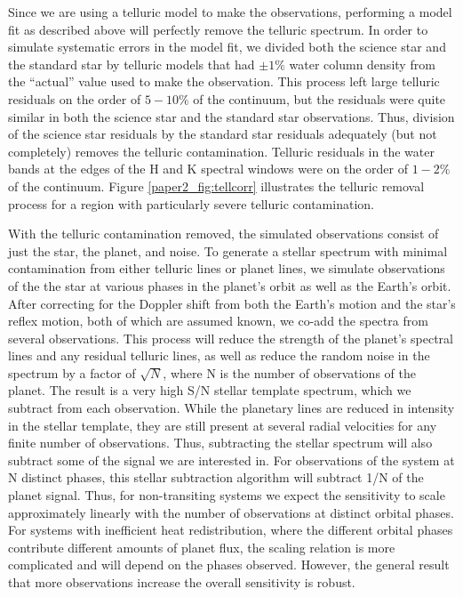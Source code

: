 Since we are using a telluric model to make the observations, performing a model fit as described above will perfectly remove the telluric spectrum. In order to simulate systematic errors in the model fit, we 
divided both the science star and the standard star by telluric models 
that had $\pm 1\%$ water column density from the ``actual'' value used to make the
observation. This process left large telluric residuals on the order of $5-10\%$ of the continuum, but the residuals were
quite similar in both the science star and the standard star
observations. Thus, division of the science star residuals by the
standard star residuals adequately (but not completely) removes the telluric
contamination. Telluric residuals in the water bands at the edges of the H and K spectral windows were on the order of $1-2\%$ of the continuum. Figure \ref{paper2_fig:tellcorr} illustrates the telluric
removal process for a region with particularly severe telluric
contamination. 

With the telluric contamination removed, the simulated observations
consist of just the star, the planet, and noise. To generate a stellar spectrum with minimal contamination from either telluric lines or planet lines, we simulate observations of the the star at
various phases in the planet's orbit as well as the Earth's orbit. After
correcting for the Doppler shift from both the Earth's motion and the star's
reflex motion, both of which are assumed known, we co-add the spectra from several observations. This
process will reduce the strength of the planet's spectral lines and any residual telluric 
lines, as well as reduce the random noise in the spectrum by a 
factor of $\sqrt{N}$, where N is the number of observations of the planet. The result is a very high S/N stellar template spectrum, which we subtract from each observation.  While the planetary lines are reduced in intensity in the stellar template,
they are still present at several radial velocities for any finite number of observations. Thus,
subtracting the stellar spectrum will also subtract some of the signal
we are interested in. For observations of the system at N distinct
phases, this stellar subtraction algorithm will subtract 1/N of the
planet signal. Thus, for non-transiting systems we expect the sensitivity to scale approximately linearly with the number of observations at distinct orbital phases. For systems with inefficient heat redistribution, where the different orbital phases contribute different amounts of planet flux, the scaling relation is more complicated and will depend on the phases observed. However, the general result that more observations increase the overall sensitivity is robust.

